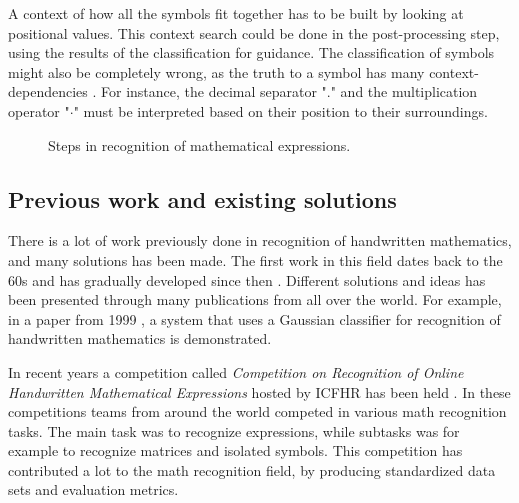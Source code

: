 A context of how all the symbols fit together has to be built by looking at positional values. This context search could be done in the post-processing step, using the results of the classification for guidance. The classification of symbols might also be completely wrong, as the truth to a symbol has many context-dependencies \cite{zanibbi_recognition_2012}. For instance, the decimal separator "." and the multiplication operator "$\cdot$" must be interpreted based on their position to their surroundings. 

\begin{figure}[H]
\centering
    \caption{Steps in recognition of mathematical expressions.}

\label{fig:steps_in_math_recog}
\end{figure}

\subsection{Previous work and existing solutions}
\label{previous_work_existing_solutions}
There is a lot of work previously done in recognition of handwritten mathematics, and many solutions has been made. The first work in this field dates back to the 60s and has gradually developed since then \cite{mouchere_icfhr2016_2016}. Different solutions and ideas has been presented through many publications from all over the world. For example, in a paper from 1999 \cite{matsakis_recognition_????}, a system that uses a Gaussian classifier for recognition of handwritten mathematics is demonstrated.

In recent years a competition called \textit{Competition on Recognition of Online Handwritten Mathematical Expressions} hosted by ICFHR has been held \cite{mouchere_icfhr2016_2016} \cite{mouchere_advancing_2016}. In these competitions teams from around the world competed in various math recognition tasks. The main task was to recognize expressions, while subtasks was for example to recognize matrices and isolated symbols. This competition has contributed a lot to the math recognition field, by producing standardized data sets and evaluation metrics.

